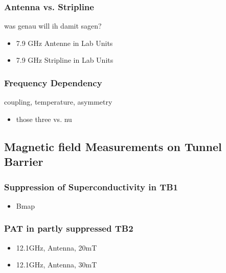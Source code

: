         \subsubsection*{Antenna vs. Stripline}
            was genau will ih damit sagen?
            \begin{itemize}
                \item 7.9 GHz Antenne in Lab Units
                \item 7.9 GHz Stripline in Lab Units
            \end{itemize}

        \subsubsection*{Frequency Dependency}

            coupling, temperature, asymmetry
            \begin{itemize}
                \item those three vs. nu
            \end{itemize}



    \subsection[Appendix]{Magnetic field Measurements on Tunnel Barrier}

        \subsubsection*{Suppression of Superconductivity in TB1}
            \begin{itemize}
                \item Bmap
            \end{itemize}

        \subsubsection*{PAT in partly suppressed TB2}
            \begin{itemize}
                \item 12.1GHz, Antenna, 20mT
                \item 12.1GHz, Antenna, 30mT
            \end{itemize}
